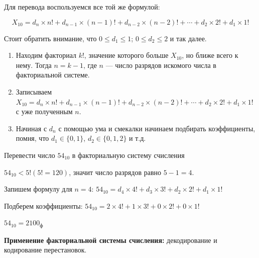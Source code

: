 Для перевода воспользуемся все той же формулой:

\[
    X_{10} = d_{n} \times n! + d_{n-1} \times (n-1)! + d_{n-2} \times (n-2)! + \cdots + d_{2}\times 2! + d_{1}\times 1!
\]

\noindent
Стоит обратить внимание, что $0 \leqslant d_{1}\leqslant 1$; $0 \leqslant d_{2}\leqslant 2$ и так далее.

\begin{enumerate}
    \item Находим факториал $k!$, значение которого больше $X_{10}$, но ближе всего к нему. Тогда $n = k - 1$, где $n$ --- число разрядов искомого числа в факториальной системе. %
    \item Записываем $X_{10} = d_{n} \times n! + d_{n-1}\times (n-1)! + \allowbreak d_{n-2} \times (n-2)! + \cdots + \allowbreak d_{2} \times 2! + \allowbreak d_{1} \times 1!$ с уже полученным $n$. %
    \item Начиная с $d_{n}$ с помощью ума и смекалки начинаем подбирать коэффициенты, помня, что $d_{1} \in \{0,1\}$, $d_{2} \in \{0,1,2\}$ и т.д.
\end{enumerate}

\begin{example}
    \task%
    Перевести число $54_{10}$ в факториальную систему счисления

    \solution%
    $54_{10} < 5! (5! = 120)$, значит число разрядов равно $5 - 1 = 4$. %

    Запишем формулу для $n = 4$: $54_{10} = d_{4} \times 4! + d_{3} \times 3! + d_{2} \times 2! + d_{1} \times 1!$ %

    Подберем коэффициенты: $54_{10} = 2 \times 4! + 1 \times 3! + 0 \times 2! + 0 \times 1!$ %

    \answer%
    $54_{10} = 2100_{\text{ф}}$
\end{example}

\noindent
\textbf{Применение факториальной системы счисления:} декодирование и кодирование перестановок.



